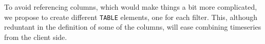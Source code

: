 \documentclass[11pt,a4paper]{ivoa}
\let\fg=\color
\def\elem#1{{\tt{\fg{DarkRed}#1}}}
\begin{document}
\begingroup

\endgroup    

To avoid referencing columns, which would make things a bit more complicated, we propose to create different \elem{TABLE} elements, one for each filter. This, although reduntant in the definition of some of the columns, will ease combining timeseries from the client side. 






%


\end{document}

